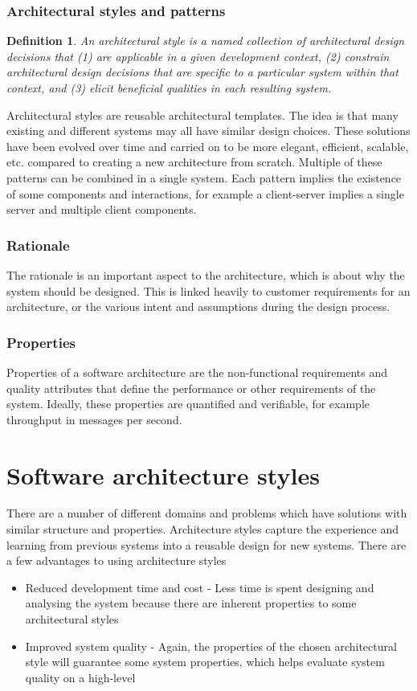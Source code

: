 \documentclass{sty/SizheArticle}
\newtheorem{definition}{Definition}
\begin{document}
\subsubsection{Architectural styles and patterns}
\begin{definition}
An architectural style is a named collection of architectural design decisions
that (1) are applicable in a given development context, (2) constrain
architectural design decisions that are specific to a particular system within
that context, and (3) elicit beneficial qualities in each resulting system.
\end{definition}

Architectural styles are reusable architectural templates. The idea is that
many existing and different systems may all have similar design choices.
These solutions have been evolved over time and carried on to be more
elegant, efficient, scalable, etc. compared to creating a new architecture
from scratch. Multiple of these patterns can be combined in a single system.
Each pattern implies the existence of some components and interactions, for
example a client-server implies a single server and multiple client components.

\subsubsection{Rationale}
The rationale is an important aspect to the architecture, which is about
why the system should be designed. This is linked heavily to customer
requirements for an architecture, or the various intent and assumptions
during the design process.

\subsubsection{Properties}
Properties of a software architecture are the non-functional requirements
and quality attributes that define the performance or other requirements of
the system. Ideally, these properties are quantified and verifiable, for example
throughput in messages per second. 

\section{Software architecture styles}
There are a number of different domains and problems which have solutions
with similar structure and properties. Architecture styles capture the
experience and learning from previous systems into a reusable design for
new systems. There are a few advantages to using architecture styles
\begin{itemize}
\item Reduced development time and cost - Less time is spent designing and
analysing the system because there are inherent properties to some
architectural styles
\item Improved system quality - Again, the properties of the chosen
architectural style will guarantee some system properties, which helps
evaluate system quality on a high-level
\end{itemize}
\end{document}
